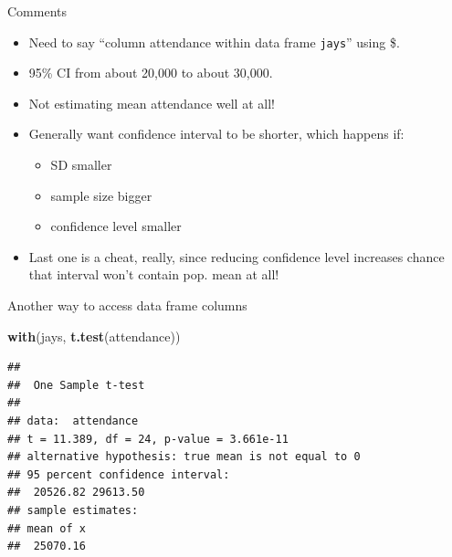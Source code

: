 \documentclass[ignorenonframetext,]{beamer}
\newenvironment{Shaded}{\begin{snugshade}}{\end{snugshade}}
\newcommand{\KeywordTok}[1]{\textcolor[rgb]{0.13,0.29,0.53}{\textbf{#1}}}
\newcommand{\NormalTok}[1]{#1}
\providecommand{\tightlist}{%
  \setlength{\itemsep}{0pt}\setlength{\parskip}{0pt}}
\begin{document}
\begin{frame}[fragile]{Comments}
\protect\hypertarget{comments-1}{}

\begin{itemize}
\tightlist
\item
  Need to say ``column attendance within data frame \texttt{jays}''
  using \$.
\item
  95\% CI from about 20,000 to about 30,000.
\item
  Not estimating mean attendance well at all!
\item
  Generally want confidence interval to be shorter, which happens if:

  \begin{itemize}
  \tightlist
  \item
    SD smaller
  \item
    sample size bigger
  \item
    confidence level smaller
  \end{itemize}
\item
  Last one is a cheat, really, since reducing confidence level increases
  chance that interval won't contain pop. mean at all!
\end{itemize}

\end{frame}

\begin{frame}[fragile]{Another way to access data frame columns}
\protect\hypertarget{another-way-to-access-data-frame-columns}{}

\begin{Shaded}
\begin{Highlighting}[]
\KeywordTok{with}\NormalTok{(jays, }\KeywordTok{t.test}\NormalTok{(attendance))}
\end{Highlighting}
\end{Shaded}

\begin{verbatim}
## 
##  One Sample t-test
## 
## data:  attendance
## t = 11.389, df = 24, p-value = 3.661e-11
## alternative hypothesis: true mean is not equal to 0
## 95 percent confidence interval:
##  20526.82 29613.50
## sample estimates:
## mean of x 
##  25070.16
\end{verbatim}

\end{frame}
\end{document}
